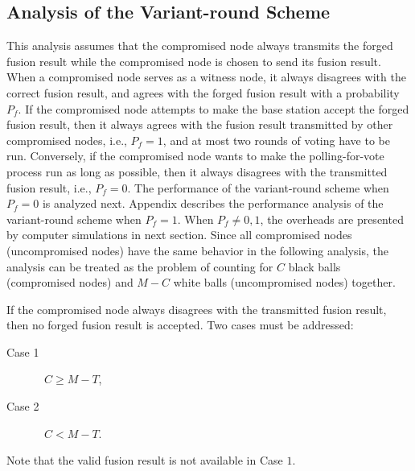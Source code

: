 \documentclass[12pt, onecolumn, draftcls]{IEEEtran}
\begin{document}
\subsection{Analysis of the Variant-round Scheme}
\label{sec:analysis_VR}

This analysis assumes that the compromised node always transmits the
forged fusion result while the compromised node is chosen to send
its fusion result. When a compromised node serves as a witness node,
it always disagrees with the correct fusion result, and agrees with
the forged fusion result with a probability $P_f$. If the
compromised node attempts to make the base station accept the forged
fusion result, then it always agrees with the fusion result
transmitted by other compromised nodes, i.e., $P_f=1$, and at most
two rounds of voting have to be run. Conversely, if the compromised
node wants to make the polling-for-vote process run as long as
possible, then it always disagrees with the transmitted fusion
result, i.e., $P_f=0$. The performance of the variant-round scheme
when $P_f=0$ is analyzed next. Appendix describes the performance
analysis of the variant-round scheme when $P_f=1$. When $P_f \ne
0,1$, the overheads are presented by computer simulations in next
section. Since all compromised nodes (uncompromised nodes) have the
same behavior in the following analysis, the analysis can be treated
as the problem of counting for $C$ black balls (compromised nodes)
and $M-C$ white balls (uncompromised nodes) together.

If the compromised node always disagrees with the transmitted fusion
result, then no forged fusion result is accepted. Two cases must be
addressed:
\begin{description}
\item[Case 1]\ $C \ge M-T$,
\item[Case 2]\ $C<M-T$.
\end{description}
Note that the valid fusion result is not available in Case $1$.
\end{document}
